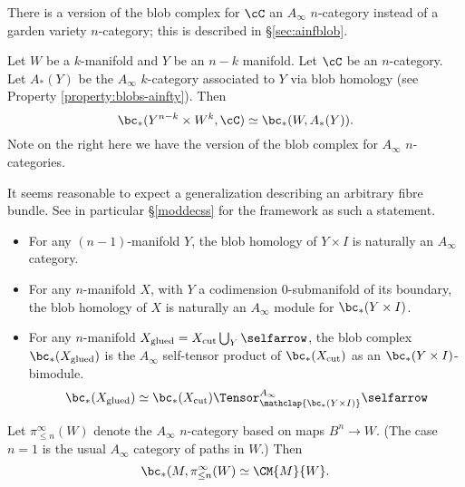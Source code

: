 There is a version of the blob complex for $\cC$ an $A_\infty$ $n$-category
instead of a garden variety $n$-category; this is described in \S \ref{sec:ainfblob}.

\begin{property}
Let $W$ be a $k$-manifold and $Y$ be an $n-k$ manifold. Let $\cC$ be an $n$-category.
Let $A_*(Y)$ be the $A_\infty$ $k$-category associated to $Y$ via blob homology (see Property \ref{property:blobs-ainfty}).
Then
\[
	\bc_*(Y^{n-k}\times W^k, \cC) \simeq \bc_*(W, A_*(Y)) .
\]
Note on the right here we have the version of the blob complex for $A_\infty$ $n$-categories.
\end{property}
It seems reasonable to expect a generalization describing an arbitrary fibre bundle. See in particular \S \ref{moddecss} for the framework as such a statement.

\begin{property}
\label{property:gluing}%
\mbox{}%
\begin{itemize}
\item For any $(n-1)$-manifold $Y$, the blob homology of $Y \times I$ is
naturally an $A_\infty$ category. %

\item For any $n$-manifold $X$, with $Y$ a codimension $0$-submanifold of its boundary, the blob homology of $X$ is naturally an
$A_\infty$ module for $\bc_*(Y \times I)$.

\item For any $n$-manifold $X_\text{glued} = X_\text{cut} \bigcup_Y \selfarrow$, the blob complex $\bc_*(X_\text{glued})$ is the $A_\infty$ self-tensor product of
$\bc_*(X_\text{cut})$ as an $\bc_*(Y \times I)$-bimodule.
\begin{equation*}
\bc_*(X_\text{glued}) \simeq \bc_*(X_\text{cut}) \Tensor^{A_\infty}_{\mathclap{\bc_*(Y \times I)}} \selfarrow
\end{equation*}
\end{itemize}
\end{property}



\begin{property}
Let $\pi^\infty_{\le n}(W)$ denote the $A_\infty$ $n$-category based on maps 
$B^n \to W$.
(The case $n=1$ is the usual $A_\infty$ category of paths in $W$.)
Then 
$$\bc_*(M, \pi^\infty_{\le n}(W) \simeq \CM{M}{W}.$$
\end{property}

